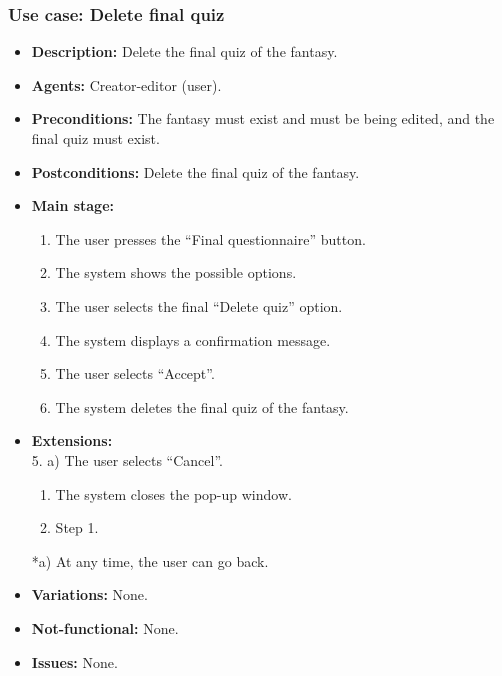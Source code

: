 \subsubsection{Use case: Delete final quiz}
\begin{itemize}
	\item \textbf{Description:} Delete the final quiz of the fantasy.
	\item \textbf{Agents:} Creator-editor (user).
	\item \textbf{Preconditions:} The fantasy must exist and must be being edited, and the final quiz must exist.
	\item \textbf{Postconditions:} Delete the final quiz of the fantasy.
	\item \textbf{Main stage:}
	\begin{enumerate}
		\item The user presses the ``Final questionnaire'' button.
		\item The system shows the possible options.
		\item The user selects the final ``Delete quiz'' option.
		\item The system displays a confirmation message.
		\item The user selects ``Accept''.
		\item The system deletes the final quiz of the fantasy.
	\end{enumerate}
	\item \textbf{Extensions:} \\ 5. a) The user selects ``Cancel''.
	\begin{enumerate}
		\item The system closes the pop-up window.
		\item Step 1.
	\end{enumerate}
	*a) At any time, the user can go back.
	\item \textbf{Variations:} None.
	\item \textbf{Not-functional:} None.
	\item \textbf{Issues:} None.
\end{itemize}

